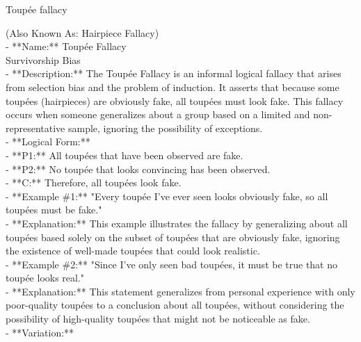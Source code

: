 \documentclass[a4paper,12pt,single,pdftex]{scrartcl}
\begin{document}
Toupée fallacy
    
      (Also Known As: Hairpiece Fallacy)
    \\

  
    
      - **Name:** Toupée Fallacy
    \\

    
       Survivorship Bias
    \\

    
      - **Description:** The Toupée Fallacy is an informal logical fallacy that arises from selection bias and the problem of induction. It asserts that because some toupées (hairpieces) are obviously fake, all toupées must look fake. This fallacy occurs when someone generalizes about a group based on a limited and non-representative sample, ignoring the possibility of exceptions.
    \\

    
      - **Logical Form:**
    \\

    
        - **P1:** All toupées that have been observed are fake.
    \\

    
        - **P2:** No toupée that looks convincing has been observed.
    \\

    
        - **C:** Therefore, all toupées look fake.
    \\

    
      - **Example \#1:** "Every toupée I've ever seen looks obviously fake, so all toupées must be fake."
    \\

    
      - **Explanation:** This example illustrates the fallacy by generalizing about all toupées based solely on the subset of toupées that are obviously fake, ignoring the existence of well-made toupées that could look realistic.
    \\

    
      - **Example \#2:** "Since I've only seen bad toupées, it must be true that no toupée looks real."
    \\

    
      - **Explanation:** This statement generalizes from personal experience with only poor-quality toupées to a conclusion about all toupées, without considering the possibility of high-quality toupées that might not be noticeable as fake.
    \\

    
      - **Variation:**
    \\
\end{document}
